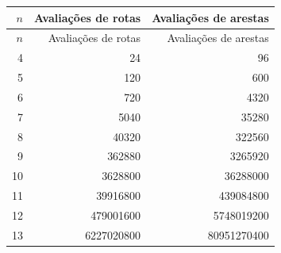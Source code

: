 \begin{longtable}{rrr}
\toprule
$n$ & Avaliações de rotas & Avaliações de arestas \\
\midrule\endfirsthead
\toprule
$n$ & Avaliações de rotas & Avaliações de arestas \\
\midrule\endhead
4 & 24 & 96 \\
5 & 120 & 600 \\
6 & 720 & 4320 \\
7 & 5040 & 35280 \\
8 & 40320 & 322560 \\
9 & 362880 & 3265920 \\
10 & 3628800 & 36288000 \\
11 & 39916800 & 439084800 \\
12 & 479001600 & 5748019200 \\
13 & 6227020800 & 80951270400 \\
\bottomrule
\end{longtable}
